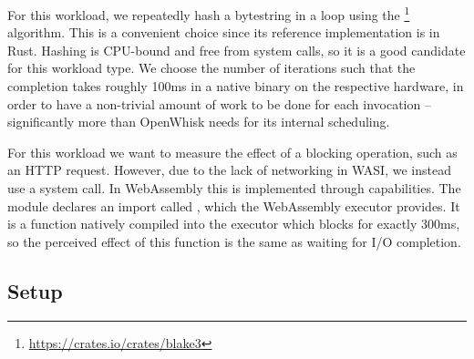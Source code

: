 \begin{description}[style=multiline, leftmargin=2.5cm, font=\bfseries]
    \item[CPU-bound] For this workload, we repeatedly hash a bytestring in a loop using the \footnote{\url{https://crates.io/crates/blake3}} algorithm. This is a convenient choice since its reference implementation is in Rust. Hashing is CPU-bound and free from system calls, so it is a good candidate for this workload type. We choose the number of iterations such that the completion takes roughly 100ms in a native binary on the respective hardware, in order to have a non-trivial amount of work to be done for each invocation -- significantly more than OpenWhisk needs for its internal scheduling.
    \item[I/O-bound] For this workload we want to measure the effect of a blocking operation, such as an HTTP request. However, due to the lack of networking in WASI, we instead use a  system call. In WebAssembly this is implemented through capabilities. The module declares an import called , which the WebAssembly executor provides. It is a function natively compiled into the executor which blocks for exactly 300ms, so the perceived effect of this function is the same as waiting for I/O completion.
\end{description}


\subsection{Setup}

